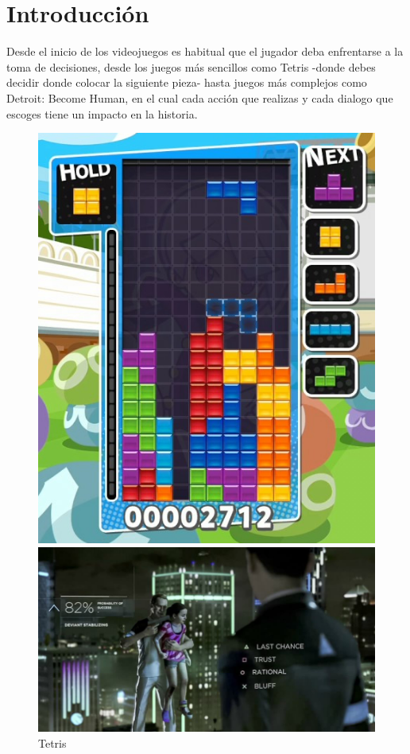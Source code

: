 \documentclass[12pt]{article}
\begin{document}
\newpage
\pagestyle{plain}

\section{Introducción}
Desde el inicio de los videojuegos es habitual que el jugador deba enfrentarse a la toma de decisiones, desde los juegos más sencillos como Tetris -donde debes decidir donde colocar la siguiente pieza- hasta juegos más complejos como Detroit: Become Human, en el cual cada acción que realizas y cada dialogo que escoges tiene un impacto en la historia.

\begin{figure}[h]
    \centering
    \begin{minipage}{.3\textwidth}
        \includegraphics[width=\textwidth]{imgs/tetris.png}
        \caption*{Tetris}
    \end{minipage}
    \begin{minipage}{.69\textwidth}
        \includegraphics[width=\textwidth]{imgs/detroit-choices.jpg}

\end{minipage}
\end{figure}
\end{document}
